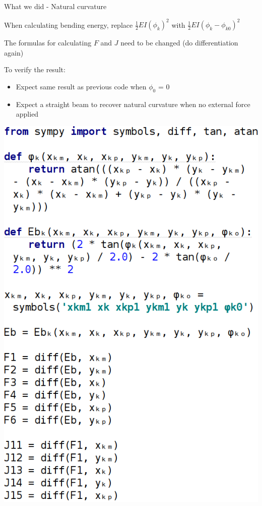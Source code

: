 \documentclass{beamer}
\newlength{\currentparskip}
\newenvironment{minipageparskip}[1]{\setlength{\currentparskip}{\parskip}\begin{minipage}{#1}\setlength{\parskip}{\currentparskip}}{\end{minipage}}
\begin{document}
	\begin{frame}{What we did - Natural curvature}
		\begin{minipageparskip}{0.5\textwidth}
			When calculating bending energy, replace $\frac12EI(\phi_k)^2$ with $\frac12EI(\phi_k - \phi_{k0})^2$
			
			The formulas for calculating $F$ and $J$ need to be changed (do differentiation again)
			
			\footnotesize
			To verify the result:
			\begin{itemize}
				\item Expect same result as previous code when $\phi_0$ = 0
				\item Expect a straight beam to recover natural curvature when no external force applied
			\end{itemize}
		\end{minipageparskip}%
		\hspace{0.05\textwidth}%
		\begin{minipageparskip}{0.45\textwidth}
			\includegraphics[width=\textwidth]{res/diff.png}
		\end{minipageparskip}
	\end{frame}
\end{document}
